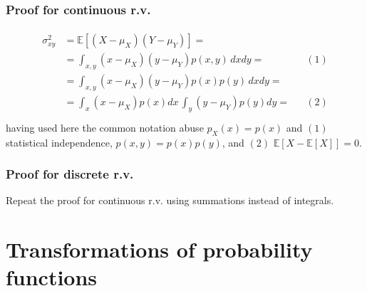 \documentclass[letterpaper,10pt,english]{jupyterBook}
\begin{document}
\subsubsection*{Proof for continuous r.v.}
\begin{equation*}
\begin{split}\begin{aligned}
  \sigma^2_{xy}
  & = \mathbb{E} \left[ (X - \mu_X) (Y - \mu_Y)  \right] = \\
  & = \int_{x,y} ( x - \mu_X) ( y - \mu_Y) p(x,y) \, dx dy = && (1) \\
  & = \int_{x,y} ( x - \mu_X) ( y - \mu_Y) p(x) p(y) \, dx dy = \\
  & = \int_{x} ( x - \mu_X) p(x) dx \, \int_{y} ( y - \mu_Y) p(y) dy = && (2) \\
\end{aligned}\end{split}
\end{equation*}
\sphinxAtStartPar
having used here the common notation abuse \(p_X(x) = p(x)\) and \((1)\) statistical independence, \(p(x,y) = p(x) p(y)\), and \((2)\) \(\mathbb{E}\left[ X - \mathbb{E}[X] \right] = 0\).
\subsubsection*{Proof for discrete r.v.}

\sphinxAtStartPar
Repeat the proof for continuous r.v. using summations instead of integrals.

\sphinxstepscope


\section{Transformations of probability functions}
\label{\detokenize{ch/prob/transformations:transformations-of-probability-functions}}\label{\detokenize{ch/prob/transformations:prob-transformations}}\label{\detokenize{ch/prob/transformations::doc}}
\sphinxstepscope
\end{document}
